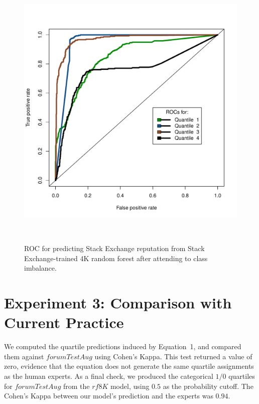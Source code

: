   \begin{figure}
\centering
  \includegraphics[width=0.8\columnwidth]{Figs/SE_auc_curve_on_SE_test_set_balanced.pdf}
  \caption{ROC for predicting Stack Exchange reputation from Stack
    Exchange-trained 4K random forest after attending to class
    imbalance.}  ~\label{fig:seOnSERoc}
\end{figure}


\section{Experiment 3: Comparison with Current Practice}
We computed the quartile predictions induced by Equation~1, and
compared them against $forumTestAug$ using Cohen's Kappa. This test
returned a value of zero, evidence that the equation does not generate
the same quartile assignments as the human experts. As a final check,
we produced the categorical $1/0$ quartiles for $forumTestAug$ from
the $rf8K$ model, using $0.5$ as the probability cutoff. The Cohen's
Kappa between our model's prediction and the experts was $0.94$.



